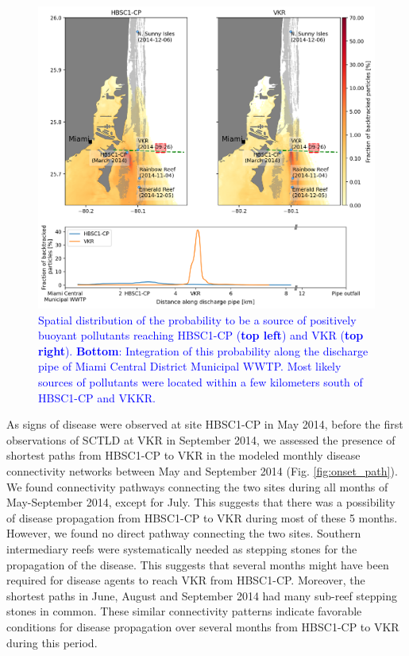 \documentclass[preprint,12pt,authoryear]{elsarticle}
\newcommand{\modif}[1]{\textcolor{blue}{#1}}
\begin{document}
\begin{figure}
    \centering
    \includegraphics[width=.98\textwidth]{figures/fig_proba_stokes.png}
    \caption{\modif{Spatial distribution of the probability to be a source of positively buoyant pollutants reaching HBSC1-CP (\textbf{top left}) and VKR (\textbf{top right}). \textbf{Bottom}: Integration of this probability along the discharge pipe of Miami Central District Municipal WWTP. Most likely sources of pollutants were located within a few kilometers south of HBSC1-CP and VKKR.}}
    \label{fig:backtrack}
\end{figure}

As signs of disease were observed at site HBSC1-CP in May 2014, before the first observations of SCTLD at VKR in September 2014, we assessed the presence of shortest paths from HBSC1-CP to VKR in the modeled monthly disease connectivity networks between May and September 2014 (Fig. \ref{fig:onset_path}). We found connectivity pathways connecting the two sites during all months of May-September 2014, except for July. This suggests that there was a possibility of disease propagation from HBSC1-CP to VKR during most of these 5 months. However, we found no direct pathway connecting the two sites. Southern intermediary reefs were systematically needed as stepping stones for the propagation of the disease. This suggests that several months might have been required for disease agents to reach VKR from HBSC1-CP. Moreover, the shortest paths in June, August and September 2014 had many sub-reef stepping stones in common. These similar connectivity patterns indicate favorable conditions for disease propagation over several months from HBSC1-CP to VKR during this period. 
\end{document}
